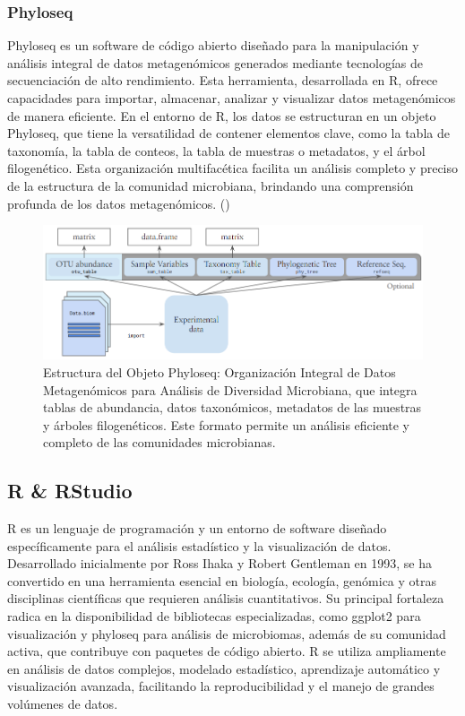 \subsubsection{Phyloseq}
Phyloseq es un software de código abierto diseñado para la manipulación y análisis integral de datos metagenómicos generados mediante tecnologías de secuenciación de alto rendimiento. Esta herramienta, desarrollada en R, ofrece capacidades para importar, almacenar, analizar y visualizar datos metagenómicos de manera eficiente. En el entorno de R, los datos se estructuran en un objeto Phyloseq, que tiene la versatilidad de contener elementos clave, como la tabla de taxonomía, la tabla de conteos, la tabla de muestras o metadatos, y el árbol filogenético. Esta organización multifacética facilita un análisis completo y preciso de la estructura de la comunidad microbiana, brindando una comprensión profunda de los datos metagenómicos. (\cite{mcmurdie2013})\\

\begin{figure}[h]
\centering
\includegraphics[width=\textwidth]{Img/cap2/Phyloseq.png}
\caption{Estructura del Objeto Phyloseq: Organización Integral de Datos Metagenómicos para Análisis de Diversidad Microbiana, que integra tablas de abundancia, datos taxonómicos, metadatos de las muestras y árboles filogenéticos. Este formato permite un análisis eficiente y completo de las comunidades microbianas.}%
\end{figure}

\subsection{R \& RStudio}
R es un lenguaje de programación y un entorno de software diseñado específicamente para el análisis estadístico y la visualización de datos. Desarrollado inicialmente por Ross Ihaka y Robert Gentleman en 1993, se ha convertido en una herramienta esencial en biología, ecología, genómica y otras disciplinas científicas que requieren análisis cuantitativos. Su principal fortaleza radica en la disponibilidad de bibliotecas especializadas, como ggplot2 para visualización y phyloseq para análisis de microbiomas, además de su comunidad activa, que contribuye con paquetes de código abierto. R se utiliza ampliamente en análisis de datos complejos, modelado estadístico, aprendizaje automático y visualización avanzada, facilitando la reproducibilidad y el manejo de grandes volúmenes de datos.\\

